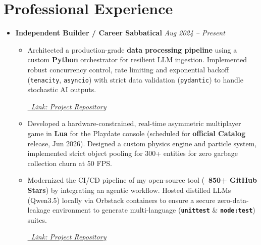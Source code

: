 \documentclass[a4paper,11pt]{article}
\begin{document}
\section{Professional Experience}
\begin{itemize}[leftmargin=*, topsep=0pt, partopsep=0pt, itemsep=1em, parsep=0pt] %

\item
    \textbf{Independent Builder / Career Sabbatical} \hfill \textit{Aug 2024 – Present} \\
    \begin{itemize}[leftmargin=1.5em, topsep=2pt, itemsep=2pt]
        \item Architected a production-grade \textbf{data processing pipeline} using a custom \textbf{Python} orchestrator for resilient LLM ingestion. Implemented robust concurrency control, rate limiting and exponential backoff (\texttt{tenacity}, \texttt{asyncio}) with strict data validation (\texttt{pydantic}) to handle stochastic AI outputs.
                                \vspace{-1.7em}
            \begin{flushright}
        \href{https://github.com/isaacbernat/basepaint}{\textit{\small \faGithub\ Link: Project Repository}}
            \end{flushright}
                                                    \vspace{-0.7em}


        \item Developed a hardware-constrained, real-time asymmetric multiplayer game in \textbf{Lua} for the Playdate console (scheduled for \textbf{official Catalog} release, Jun 2026). Designed a custom physics engine and particle system, implemented strict object pooling for 300+ entities for zero garbage collection churn at 50 FPS.

        \item Modernized the CI/CD pipeline of my open-source tool (\textbf{\faStar\ 850+ GitHub Stars}) by integrating an agentic workflow. Hosted distilled LLMs (Qwen3.5) locally via Orbstack containers to ensure a secure zero-data- leakage environment to generate multi-language (\textbf{\texttt{unittest}} \& \textbf{\texttt{node:test}}) suites.
      
                                \vspace{-1.7em}
            \begin{flushright}
        \href{https://github.com/isaacbernat/netflix-to-srt}{\textit{\small \faGithub\ Link: Project Repository}}
            \end{flushright}

    \end{itemize}
   \end{itemize}
\end{document}
